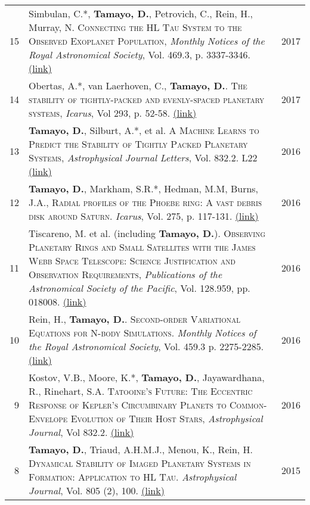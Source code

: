 \documentclass[10pt]{article} %
\begin{document}
{\begin{tabular}{>{\hfill}r|p{14.3cm}l}
15 & Simbulan, C.*, {\bf Tamayo, D.}, Petrovich, C., Rein, H., Murray, N. \textsc{Connecting the HL Tau System to the Observed Exoplanet Population}, {\it Monthly Notices of the Royal Astronomical Society}, Vol. 469.3, p. 3337-3346. \href{https://arxiv.org/abs/1703.09132}{(link)} & 2017 \\

14 & Obertas, A.*, van Laerhoven, C., {\bf Tamayo, D.}. \textsc{The stability of tightly-packed and evenly-spaced planetary systems}, {\it Icarus}, Vol 293, p. 52-58. \href{https://arxiv.org/abs/1703.08426}{(link)} & 2017 \\

13 & {\bf Tamayo, D.}, Silburt, A.*, et al. \textsc{A Machine Learns to Predict the Stability of Tightly Packed Planetary Systems}, {\it Astrophysical Journal Letters}, Vol. 832.2. L22 \href{https://arxiv.org/abs/1610.05359}{(link)}& 2016 \\

12 & {\bf Tamayo, D.}, Markham, S.R.*, Hedman, M.M, Burns, J.A., \textsc{Radial profiles of the Phoebe ring: A vast debris disk around Saturn}.  {\it Icarus}, Vol. 275, p. 117-131. \href{http://arxiv.org/abs/1604.03119}{(link)} & 2016 \\

11 & Tiscareno, M. et al. (including {\bf Tamayo, D.}). \textsc{Observing Planetary Rings and Small Satellites with the James Webb Space Telescope: Science Justification and Observation Requirements}, {\it Publications of the Astronomical Society of the Pacific}, Vol. 128.959, pp. 018008. \href{https://arxiv.org/abs/1403.6849v3}{(link)} & 2016 \\

10 & Rein, H., {\bf Tamayo, D.}. \textsc{Second-order Variational Equations for N-body Simulations.} {\it Monthly Notices of the Royal Astronomical Society}, Vol. 459.3 p. 2275-2285. \href{http://arxiv.org/abs/1603.03424}{(link)} & 2016 \\

9 & Kostov, V.B., Moore, K.*, {\bf Tamayo, D.}, Jayawardhana, R., Rinehart, S.A. \textsc{Tatooine's Future: The Eccentric Response of Kepler's Circumbinary Planets to Common-Envelope Evolution of Their Host Stars}, {\it Astrophysical Journal}, Vol 832.2. \href{https://arxiv.org/abs/1610.03436}{(link)} & 2016 \\

8 & {\bf Tamayo, D.}, Triaud, A.H.M.J., Menou, K., Rein, H. \textsc{Dynamical Stability of Imaged Planetary Systems in Formation:  Application to HL Tau}. {\it Astrophysical Journal}, Vol. 805 (2), 100. \href{http://arxiv.org/abs/1502.05099}{(link)} & 2015 \\


\end{tabular}}
\end{document}
